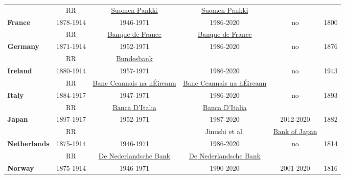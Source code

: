 \begin{landscape}
\begin{table}[]
\begin{longtable}{l*{1}{cccc|c}}
         & RR \citeyear{Reinhart2009} & \href{https://www.suomenpankki.fi/en/bank-of-finland/history/}{Suomen Pankki}  & \href{https://www.suomenpankki.fi/en/bank-of-finland/history/}{Suomen Pankki}  & & \\
[1ex]
\textbf{France}     & 1878-1914  & 1946-1971  & 1986-2020 & no & 1800\\
    & RR \citeyear{Reinhart2009} & \href{https://www.banque-france.fr/en/page-sommaire/history}{Banque de France}  & \href{https://www.banque-france.fr/en/page-sommaire/history}{Banque de France} &  \\
[1ex]
\textbf{Germany} & 1871-1914 & 1952-1971 & 1986-2020 & no & 1876 \\
    & RR \citeyear{Reinhart2009} & \href{https://www.bundesbank.de/de/presse/pressematerial/60-jahre/rechtlicher-rahmen}{Bundesbank}  & \cite{vonHagen1999}   &  \\
[1ex]
\textbf{Ireland}  & 1880-1914 & 1957-1971 & 1986-2020 & no & 1943\\
         & RR \citeyear{Reinhart2009}    & \href{https://www.centralbank.ie/docs/default-source/publications/the-history-of-the-central-bank-1943-2013.pdf?sfvrsn=b0dcd31d_8}{Banc Ceannais na hÉireann} & \href{https://www.centralbank.ie/docs/default-source/publications/the-history-of-the-central-bank-1943-2013.pdf?sfvrsn=b0dcd31d_8}{Banc Ceannais na hÉireann} &  \\
[1ex]
\textbf{Italy}  & 1884-1917 & 1947-1971 & 1986-2020 & no & 1893\\
         & RR \citeyear{Reinhart2009}    & \href{https://www.bancaditalia.it/chi-siamo/storia/seconda-guerra-mondiale/index.html}{Banca D'Italia} & \href{https://www.bancaditalia.it/chi-siamo/storia/anni-cinquanta/index.html}{Banca D'Italia} &  \\
[1ex]
\textbf{Japan}  & 1897-1917 & 1952-1971 & 1987-2020 & 2012-2020 & 1882\\
         & RR \citeyear{Reinhart2009} & \cite{Shizume2018} & Jinushi et al. \citeyear{Jinushi2000} & \href{https://www.boj.or.jp/en/announcements/release_2012/k120214b.pdf}{Bank of Japan} & \\
[1ex]
\textbf{Netherlands}  & 1875-1914 & 1946-1971 & 1986-2020 & no & 1814\\
         & RR \citeyear{Reinhart2009} & \href{https://www.dnb.nl/en/about-dnb/organisation/history/index.jsp}{De Nederlandsche Bank} & \href{https://www.dnb.nl/en/about-dnb/organisation/history/index.jsp}{De Nederlandsche Bank} &  & \\
[1ex]
\textbf{Norway}    & 1875-1914 & 1946-1971 & 1990-2020 & 2001-2020 & 1816 \\

\end{longtable}
\end{table}
\end{landscape}
